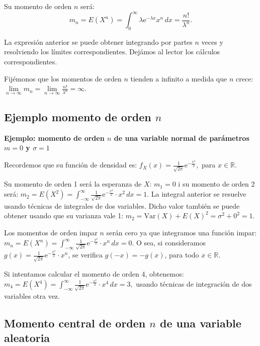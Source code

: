 \documentclass[]{book}
\begin{document}
Su momento de orden \(n\) será:
\[
m_n = E\left(X^n\right)=\int_0^\infty \lambda \mathrm{e}^{-\lambda x} x^n\, dx =\frac{n!}{\lambda^n}.
\]

La expresión anterior se puede obtener integrando por partes \(n\) veces y resolviendo los límites correspondientes. Dejámos al lector los cálculos correspondientes.

Fijémonos que los momentos de orden \(n\) tienden a infinito a medida que \(n\) crece: \(\lim\limits_{n\to\infty}m_n = \lim\limits_{n\to\infty}\frac{n!}{\lambda^n}=\infty\).

\hypertarget{ejemplo-momento-de-orden-n-2}{%
\subsection{\texorpdfstring{Ejemplo momento de orden \(n\)}{Ejemplo momento de orden n}}\label{ejemplo-momento-de-orden-n-2}}

\textbf{Ejemplo: momento de orden \(n\) de una variable normal de parámetros \(m=0\) y \(\sigma =1\)}

Recordemos que su función de densidad es: \(f_X(x)=\frac{1}{\sqrt{2\pi}}\mathrm{e}^{-\frac{x^2}{2}},\) para \(x\in \mathbb{R}\).

Su momento de orden 1 será la esperanza de \(X\): \(m_1 = 0\) i su momento de orden 2 será:
\(m_2 = E\left(X^2\right)=\int_{-\infty}^\infty \frac{1}{\sqrt{2\pi}}\mathrm{e}^{-\frac{x^2}{2}}\cdot x^2\, dx = 1.\)
La integral anterior se resuelve usando técnicas de integrales de dos variables.
Dicho valor también se puede obtener usando que su varianza vale 1:
\(m_2 = \mathrm{Var}(X)+E(X)^2 = \sigma^2 +0^2 = 1.\)

Los momentos de orden impar \(n\) serán cero ya que integramos una función impar:
\(m_n = E\left(X^n\right)=\int_{-\infty}^\infty \frac{1}{\sqrt{2\pi}}\mathrm{e}^{-\frac{x^2}{2}}\cdot x^n\, dx = 0.\)
O sea, si consideramos \(g(x)=\frac{1}{\sqrt{2\pi}}\mathrm{e}^{-\frac{x^2}{2}}\cdot x^n\), se verifica \(g(-x)=-g(x)\), para todo \(x\in\mathbb{R}\).

Si intentamos calcular el momento de orden 4, obtenemos:
\(m_4 = E\left(X^4\right)=\int_{-\infty}^\infty \frac{1}{\sqrt{2\pi}}\mathrm{e}^{-\frac{x^2}{2}}\cdot x^4\, dx = 3,\) usando técnicas de integración de dos variables otra vez.

\hypertarget{momento-central-de-orden-n-de-una-variable-aleatoria}{%
\subsection{\texorpdfstring{Momento central de orden \(n\) de una variable aleatoria}{Momento central de orden n de una variable aleatoria}}\label{momento-central-de-orden-n-de-una-variable-aleatoria}}
\end{document}
